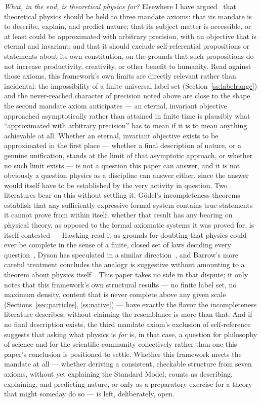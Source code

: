 \documentclass[aps,prd,twocolumn,superscriptaddress,nofootinbib]{revtex4-2}
\begin{document}
\emph{What, in the end, is theoretical physics for?} Elsewhere I have
argued~\cite{Yang2026Mandate} that theoretical physics should be held to
three mandate axioms: that its mandate is to describe, explain, and
predict nature; that its subject matter is accessible, or at least could
be approximated with arbitrary precision, with an objective that is
eternal and invariant; and that it should exclude self-referential
propositions or statements about its own constitution, on the grounds
that such propositions do not increase productivity, creativity, or
other benefit to humanity. Read against those axioms, this framework's
own limits are directly relevant rather than incidental: the impossibility
of a finite universal label set (Section~\ref{ss:labelrange}) and the
never-reached character of precision noted above are close to the shape
the second mandate axiom anticipates — an eternal, invariant objective
approached asymptotically rather than attained in finite time is
plausibly what ``approximated with arbitrary precision'' has to mean if
it is to mean anything achievable at all. Whether an eternal, invariant
objective exists to be approximated in the first place — whether a final
description of nature, or a genuine unification, stands at the limit of
that asymptotic approach, or whether no such limit exists — is not a
question this paper can answer, and it is not obviously a question
physics as a discipline can answer either, since the answer would itself
have to be established by the very activity in question. Two literatures
bear on this without settling it. G\"odel's incompleteness
theorems~\cite{Godel1931} establish that any sufficiently expressive
formal system contains true statements it cannot prove from within
itself; whether that result has any bearing on physical theory, as
opposed to the formal axiomatic systems it was proved for, is itself
contested — Hawking read it as grounds for doubting that physics could
ever be complete in the sense of a finite, closed set of laws deciding
every question~\cite{Hawking2002}, Dyson has speculated in a similar
direction~\cite{Dyson2009}, and Barrow's more careful treatment concludes
the analogy is suggestive without amounting to a theorem about physics
itself~\cite{Barrow2011}. This paper takes no side in that dispute; it
only notes that this framework's own structural results — no finite
label set, no maximum density, content that is never complete above any
given scale (Sections~\ref{sec:particles}, \ref{ss:native}) — have
exactly the flavor the incompleteness literature describes, without
claiming the resemblance is more than that. And if no final description
exists, the third mandate axiom's exclusion of self-reference suggests
that asking what physics is \emph{for} is, in that case, a question for
philosophy of science and for the scientific community collectively
rather than one this paper's conclusion is positioned to settle. Whether
this framework meets the mandate at all — whether deriving a consistent,
checkable structure from seven axioms, without yet explaining the
Standard Model, counts as describing, explaining, and predicting nature,
or only as a preparatory exercise for a theory that might someday do so
— is left, deliberately, open.
\end{document}
